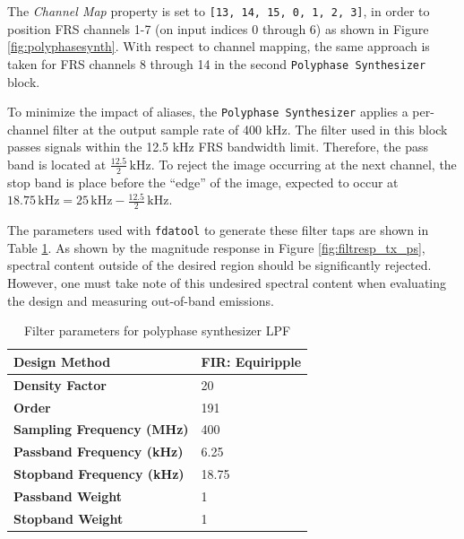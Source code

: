 The \textit{Channel Map} property is set to \texttt{[13, 14, 15, 0, 1, 2, 3]},
in order to position \ac{FRS} channels 1-7 (on input indices 0 through 6)
as shown in Figure \ref{fig:polyphasesynth}. With respect to channel mapping,
the same approach is taken for \ac{FRS} channels 8 through 14 in the second
\texttt{Polyphase Synthesizer} block.

To minimize the impact of aliases, the \texttt{Polyphase Synthesizer} applies
a per-channel filter at the output sample rate of 400 kHz. The filter used in
this block passes signals within the 12.5 kHz \ac{FRS} bandwidth limit.
Therefore, the pass band is located at $\frac{12.5}{2} \, \text{kHz}$.
To reject the image occurring at the next channel, the stop band is place before
the ``edge'' of the image, expected to occur at $18.75 \,\text{kHz} = 25
\,\text{kHz} - \frac{12.5}{2} \,\text{kHz}$.

The parameters used with \texttt{fdatool} to generate these
filter taps are shown in Table \ref{tab:tx_polysynth}. As shown by the magnitude
response in Figure \ref{fig:filtresp_tx_ps}, spectral content outside of the
desired region should be significantly rejected. However, one must take note
of this undesired spectral content when evaluating the design and measuring
out-of-band emissions.

\begin{table}[h]
  \centering
  \caption{Filter parameters for polyphase synthesizer LPF}
  \label{tab:tx_polysynth}
  \footnotesize
  \begin{tabular} {|l|l|}
    \hline
    \textbf{Design Method}              & FIR: Equiripple \\ \hline
    \textbf{Density Factor}             & 20              \\ \hline
    \textbf{Order}                      & 191             \\ \hline
    \textbf{Sampling Frequency (MHz)}   & 400             \\ \hline
    \textbf{Passband Frequency (kHz)}   & 6.25            \\ \hline
    \textbf{Stopband Frequency (kHz)}   & 18.75           \\ \hline
    \textbf{Passband Weight}            & 1               \\ \hline
    \textbf{Stopband Weight}            & 1               \\ \hline
  \end{tabular}
\end{table}

